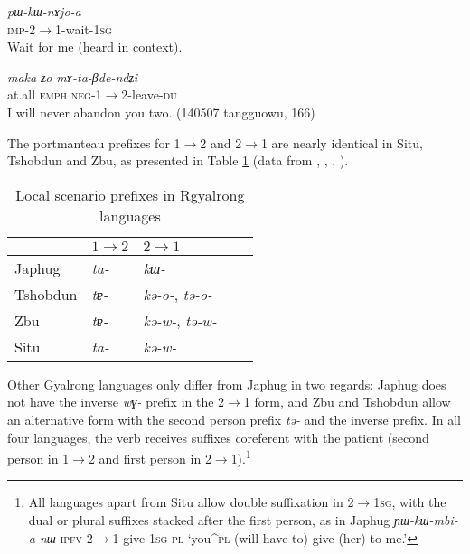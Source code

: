 \documentclass[oneside,a4paper,11pt]{article}
\newcommand{\ipa}[1]{\mbox{\phon\textit{#1}}} %
\begin{document}
\begin{exe}
\ex \label{ex:2.1sg}
\gll \ipa{pɯ-kɯ-nɤjo-a} \\
\textsc{imp}-2$\rightarrow$1-wait-\textsc{1sg} \\
\glt Wait for me (heard in context).
\end{exe}

\begin{exe}
\ex \label{ex:1.2du}
\gll  \ipa{maka} 	\ipa{ʑo} 	\ipa{mɤ-ta-βde-ndʑi} \\
at.all \textsc{emph} \textsc{neg}-1$\rightarrow$2-leave-\textsc{du} \\
\glt I will never abandon you two. (140507 tangguowu, 166)
\end{exe}

The portmanteau prefixes for 1$\rightarrow$2 and 2$\rightarrow$1 are nearly identical in Situ, Tshobdun and Zbu, as presented in Table \ref{tab:local.rgy} (data from \citealt[218]{linxr93jiarong}, \citealt{jackson02rentongdengdi}, \citealt{jacques12agreement}, \citealt{gongxun14agreement}).

\begin{table}[H]
\caption{Local scenario prefixes in Rgyalrong languages} \centering \label{tab:local.rgy} 
\begin{tabular}{lllll}
\toprule
& $1\rightarrow2$ & $2\rightarrow1$ \\
\midrule
Japhug &  \ipa{ta-} & \ipa{kɯ-} \\
Tshobdun &  \ipa{tɐ-} & \ipa{kə-o-}, \ipa{tə-o-} \\
Zbu &  \ipa{tɐ-} &\ipa{kə-w-}, \ipa{tə-w-} \\
Situ &  \ipa{ta-} & \ipa{kə-w-} \\
\bottomrule
\end{tabular}
\end{table}

Other Gyalrong languages only differ from Japhug in two regards: Japhug does not have the inverse \ipa{wɣ-} prefix in the  2$\rightarrow$1 form, and Zbu and Tshobdun allow an alternative form with the second person prefix \ipa{tə-} and the inverse prefix. In all four languages, the verb receives suffixes coreferent with the patient (second person in 1$\rightarrow$2 and first person in  2$\rightarrow$1).\footnote{All languages apart from Situ allow double suffixation in 2$\rightarrow$\textsc{1sg}, with the dual or plural suffixes stacked after the first person, as in Japhug \ipa{ɲɯ-kɯ-mbi-a-nɯ} \textsc{ipfv}-2$\rightarrow$1-give-\textsc{1sg-pl} `you^{\textsc{pl}} (will have to) give (her) to me.'}
\end{document}
